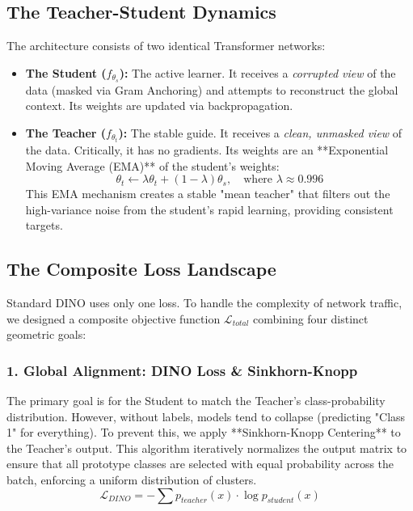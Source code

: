 \documentclass[
  10pt,
  twocolumn,
  a4paper,
  parskip=half
]{scrartcl}
\begin{document}
    \subsection{The Teacher-Student Dynamics}
    The architecture consists of two identical Transformer networks:
    \begin{itemize}
        \item \textbf{The Student ($f_{\theta_s}$):} The active learner. It receives a \textit{corrupted view} of the data (masked via Gram Anchoring) and attempts to reconstruct the global context. Its weights are updated via backpropagation.
        \item \textbf{The Teacher ($f_{\theta_t}$):} The stable guide. It receives a \textit{clean, unmasked view} of the data. Critically, it has no gradients. Its weights are an **Exponential Moving Average (EMA)** of the student's weights:
        \begin{equation}
            \theta_t \leftarrow \lambda \theta_t + (1 - \lambda) \theta_s, \quad \text{where } \lambda \approx 0.996
        \end{equation}
        This EMA mechanism creates a stable "mean teacher" that filters out the high-variance noise from the student's rapid learning, providing consistent targets.
    \end{itemize}

    \subsection{The Composite Loss Landscape}
    Standard DINO uses only one loss. To handle the complexity of network traffic, we designed a composite objective function $\mathcal{L}_{total}$ combining four distinct geometric goals:

    \subsubsection{1. Global Alignment: DINO Loss \& Sinkhorn-Knopp}
    The primary goal is for the Student to match the Teacher's class-probability distribution. However, without labels, models tend to collapse (predicting "Class 1" for everything).
    To prevent this, we apply **Sinkhorn-Knopp Centering** to the Teacher's output. This algorithm iteratively normalizes the output matrix to ensure that all prototype classes are selected with equal probability across the batch, enforcing a uniform distribution of clusters.
    \begin{equation}
        \mathcal{L}_{DINO} = - \sum p_{teacher}(x) \cdot \log p_{student}(x)
    \end{equation}
\end{document}
